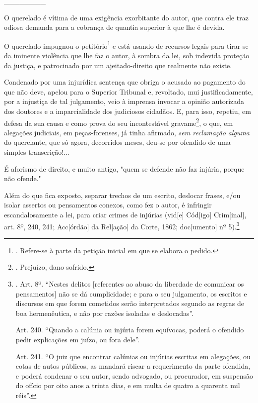\_\_\_\_\_\_\_\_

O querelado é vítima de uma exigência exorbitante do autor, que contra
ele traz odiosa demanda para a cobrança de quantia superior à que lhe é
devida.

O querelado impugnou o petitório\footnote{. Refere-se à parte da petição
  inicial em que se elabora o pedido.} e está usando de recursos legais
para tirar-se da iminente violência que lhe faz o autor, à sombra da
lei, sob indevida proteção da justiça, e patrocinado por um
ajeitado-direito que realmente não existe.

Condenado por uma injurídica sentença que obriga o acusado ao pagamento
do que não deve, apelou para o Superior Tribunal e, revoltado, mui
justificadamente, por a injustiça de tal julgamento, veio à imprensa
invocar a opinião autorizada dos doutores e a imparcialidade dos
judiciosos cidadãos. E, para isso, repetiu, em defesa da sua causa e
como prova do seu incontestável gravame\footnote{. Prejuízo, dano
  sofrido.}, o que, em alegações judiciais, em peças-forenses, já tinha
afirmado, \emph{sem reclamação} \emph{alguma} do querelante, que só
agora, decorridos meses, deu-se por ofendido de uma simples
transcrição!...

É aforismo de direito, e muito antigo, "quem se defende não faz injúria,
porque não ofende."

Além do que fica exposto, separar trechos de um escrito, deslocar
frases, e/ou isolar assertos ou pensamentos conexos, como fez o autor, é
infringir escandalosamente a lei, para criar crimes de injúrias
(vid{[}e{]} Cód{[}igo{]} Crim{[}inal{]}, art. 8º, 240, 241;
Acc{[}órdão{]} da Rel{[}ação{]} da Corte, 1862; doc{[}umento{]} nº
5).\footnote{. Art. 8º. ``Nestes delitos {[}referentes ao abuso da
  liberdade de comunicar os pensamentos{]} não se dá cumplicidade; e
  para o seu julgamento, os escritos e discursos em que forem cometidos
  serão interpretados segundo as regras de boa hermenêutica, e não por
  razões isoladas e deslocadas''.

  Art. 240. ``Quando a calúnia ou injúria forem equívocas, poderá o
  ofendido pedir explicações em juízo, ou fora dele''.

  Art. 241. ``O juiz que encontrar calúnias ou injúrias escritas em
  alegações, ou cotas de autos públicos, as mandará riscar a
  requerimento da parte ofendida, e poderá condenar o seu autor, sendo
  advogado, ou procurador, em suspensão do ofício por oito anos a trinta
  dias, e em multa de quatro a quarenta mil réis''.}

